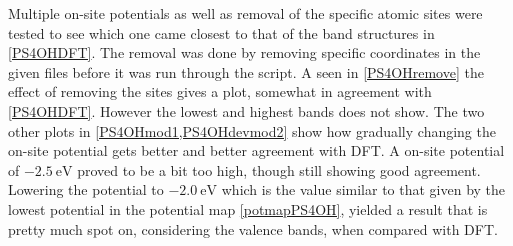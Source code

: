 Multiple on-site potentials as well as removal of the specific atomic sites were tested to see which one came closest to that of the band structures in \cref{PS4OHDFT}. The removal was done by removing specific coordinates in the given files before it was run through the script. A seen in \cref{PS4OHremove} the effect of removing the sites gives a plot, somewhat in agreement with \cref{PS4OHDFT}. However the lowest and highest bands does not show. The two other plots in \cref{PS4OHmod1,PS4OHdevmod2} show how gradually changing the on-site potential gets better and better agreement with DFT. A on-site potential of \(\SI{-2.5}{\electronvolt}\) proved to be a bit too high, though still showing good agreement. Lowering the potential to \(\SI{-2.0}{\electronvolt}\) which is the value similar to that given by the lowest potential in the potential map \cref{potmapPS4OH}, yielded a result that is pretty much spot on, considering the valence bands, when compared with DFT.
